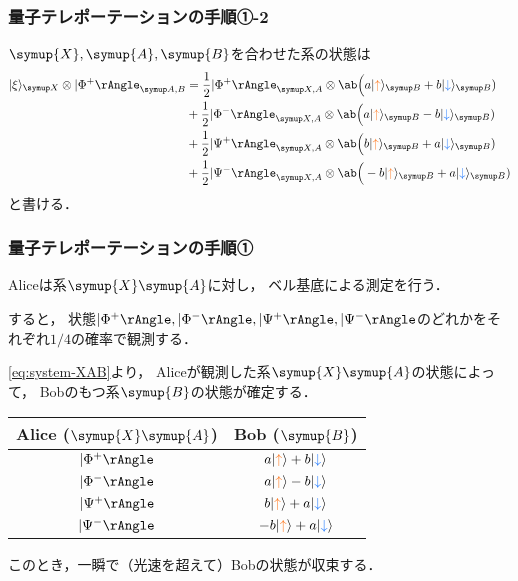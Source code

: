 \documentclass[
    10pt,
    ]{sotsu-beamer}
\newcommand{\bitone}{\mathcolor{fire}{\uparrow}}
\newcommand{\bittwo}{\mathcolor{water}{\downarrow}}
\begin{document}
\begin{frame}
    \frametitle{量子テレポーテーションの手順①-2}

    $\symup{X}, \symup{A}, \symup{B}$を合わせた系の状態は
    \begin{equation}
        \label{eq:system-XAB}
        \begin{split}
            \ket{\xi}<X> \otimes \Ket{\Phi^+}<A,B>
            &= \frac{1}{2} \Ket{\Phi^+}<X,A> \otimes 
                \ab\Big( a \ket{\bitone}<B> + b \ket{\bittwo}<B> )
                \\
            &+ \frac{1}{2} \Ket{\Phi^-}<X,A> \otimes 
                \ab\Big( a \ket{\bitone}<B> - b \ket{\bittwo}<B> )
                \\
            &+ \frac{1}{2} \Ket{\Psi^+}<X,A> \otimes 
                \ab\Big( b \ket{\bitone}<B> + a \ket{\bittwo}<B> )
            \\
            &+ \frac{1}{2} \Ket{\Psi^-}<X,A> \otimes 
                \ab\Big(-b \ket{\bitone}<B> + a \ket{\bittwo}<B> )
        \end{split}
    \end{equation}
    と書ける．

\end{frame}


\begin{frame}
    \frametitle{量子テレポーテーションの手順①}

    Aliceは系$\symup{X}\symup{A}$に対し，
    ベル基底による測定を行う．

    すると，
    状態$\Ket{\Phi^+}, \Ket{\Phi^-}, \Ket{\Psi^+}, \Ket{\Psi^-}$のどれかをそれぞれ$1/4$の確率で観測する．

    \eqref{eq:system-XAB}より，
    Aliceが観測した系$\symup{X}\symup{A}$の状態によって，
    Bobのもつ系$\symup{B}$の状態が確定する．
    \begin{center}
        \begin{tabular}{c|c}
            Alice ($\symup{X}\symup{A}$)  &  Bob ($\symup{B}$)  \\
            \hline
            $\Ket{\Phi^+}$ & $a \ket{\bitone} + b \ket{\bittwo}$  \\
            $\Ket{\Phi^-}$ & $a \ket{\bitone} - b \ket{\bittwo}$  \\
            $\Ket{\Psi^+}$ & $b \ket{\bitone} + a \ket{\bittwo}$  \\
            $\Ket{\Psi^-}$ & $-b \ket{\bitone} + a \ket{\bittwo}$  \\
        \end{tabular}
    \end{center}
    このとき，一瞬で（光速を超えて）Bobの状態が収束する．

\end{frame}
\end{document}
